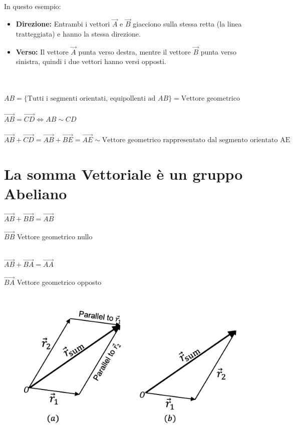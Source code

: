 \begin{nota}
\begin{center}
  \end{center}
  \leavevmode\\
  In questo esempio:
  \begin{itemize}
    \item \textbf{Direzione:} Entrambi i vettori \(\vec{A}\) e
      \(\vec{B}\) giacciono sulla stessa retta (la linea
      tratteggiata) e hanno la stessa direzione.
    \item \textbf{Verso:} Il vettore \(\vec{A}\) punta verso destra,
      mentre il vettore \(\vec{B}\) punta verso sinistra, quindi i
      due vettori hanno versi opposti.
  \end{itemize}
\end{nota}
\leavevmode\\\\
$AB=\{\text{Tutti i segmenti orientati, equipollenti ad }AB\}=\text{Vettore geometrico}$
\leavevmode\\\\
$\overrightarrow{AB}=\overrightarrow{CD}\Leftrightarrow AB\sim CD$
\leavevmode\\\\
$\overrightarrow{AB}+\overrightarrow{CD}=\overrightarrow{AB}+\overrightarrow{BE}=\overrightarrow{AE}\sim\text{Vettore geometrico rappresentato dal segmento orientato AE}$

\section{La somma Vettoriale è un gruppo Abeliano}

$\overrightarrow{AB}+\overrightarrow{BB}=\overrightarrow{AB}$

\begin{nota}
  $\overrightarrow{BB}$ Vettore geometrico nullo
\end{nota}
\leavevmode\\
$\overrightarrow{AB}+\overrightarrow{BA}=\overrightarrow{AA}$
\leavevmode\\
\begin{nota}
  $\overrightarrow{BA}$ Vettore geometrico opposto
\end{nota}
\leavevmode\\
\begin{figure}
\includegraphics[height=0.28\textwidth]{Figures/somma tra vettori.pdf}
\end{figure} 

